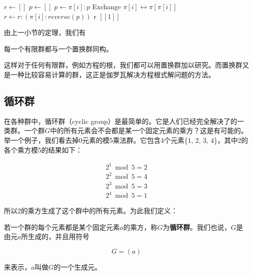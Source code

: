 \documentclass{article}
\begin{document}
\begin{algorithmic}
  \State $r \gets []$
    \State $p \gets []$
      \State $p \gets \pi[i]:p$
      \State Exchange $\pi[i] \leftrightarrow \pi[\pi[i]]$
    \EndWhile
      \State $r \gets r:(\pi[i]:reverse(p))$
    \EndIf
  \EndFor
    \State \Return r
  \Else
    \State \Return $[[1]]$ 
  \EndIf
\EndFunction
\end{algorithmic}

由上一小节的定理，我们有

\begin{theorem}
每一个有限群都与一个置换群同构。
\end{theorem}

这样对于任何有限群，例如方程的根，我们都可以用置换群加以研究。而置换群又是一种比较容易计算的群，这正是伽罗瓦解决方程根式解问题的方法。

\begin{Exercise}
\end{Exercise}

\subsection{循环群}

在各种群中，循环群（cyclic group）是最简单的。它是人们已经完全解决了的一类群。一个群$G$中的所有元素会不会都是某一个固定元素的乘方？这是有可能的。
举一个例子，我们看去掉0元素的模5乘法群。它包含4个元素\{1, 2, 3, 4\}，其中2的各个乘方模5的结果如下：

\[
\begin{array}{l}
2^1 \bmod 5 = 2 \\
2^2 \bmod 5 = 4 \\
2^3 \bmod 5 = 3 \\
2^4 \bmod 5 = 1
\end{array}
\]

所以2的乘方生成了这个群中的所有元素。为此我们定义：

\begin{definition}
若一个群的每个元素都是某个固定元素$a$的乘方，称$G$为\textbf{循环群}。我们也说，$G$是由元$a$所生成的，并且用符号

\[
G = (a)
\]

来表示，$a$叫做$G$的一个生成元。
\end{definition}
\end{document}
